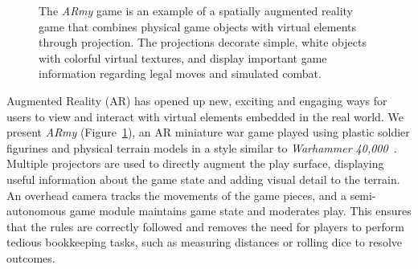 \documentclass[10pt,twocolumn,letterpaper]{article}
\begin{document}
\begin{figure}[t]
%
\caption[Images of ARmy: A Spatially Augmented Reality Game]{ The
  \emph{ARmy} game is an example of a spatially augmented reality game
  that combines physical game objects with virtual elements through
  projection.  The projections decorate simple, white objects with
  colorful virtual textures, and display important game information
  regarding legal moves and simulated combat.  }
\label{FIGURE:GameInProgress}
\vspace{-0.15in}
\end{figure}

Augmented Reality (AR) has opened up new, exciting and engaging ways
for users to view and interact with virtual elements embedded in the
real world.
We present \emph{ARmy} (Figure~\ref{FIGURE:GameInProgress}), an AR
miniature war game played using plastic soldier figurines and physical
terrain models in a style similar to \emph{Warhammer
  40,000}~\cite{Warhammer40k}.  Multiple projectors are used to
directly augment the play surface, displaying useful information about
the game state and adding visual detail to the terrain.  An overhead
camera tracks the movements of the game pieces, and a semi-autonomous
game module maintains game state and moderates play. This ensures
that the rules are correctly followed and removes the need for players
to perform tedious bookkeeping tasks, such as measuring distances or
rolling dice to resolve outcomes.
\end{document}
